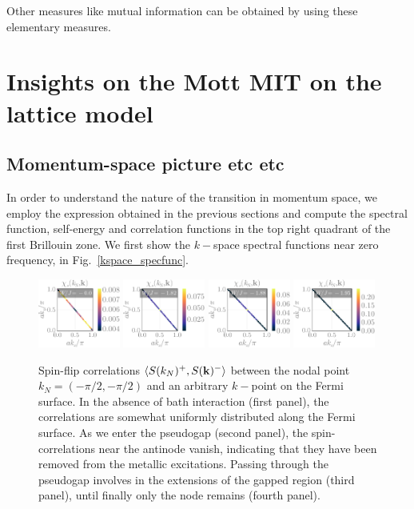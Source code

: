 \documentclass[reprint,hidelinks,onecolumn]{revtex4-2}
\begin{document}
Other measures like mutual information can be obtained by using these elementary measures.

\section{Insights on the Mott MIT on the lattice model}
\subsection{Momentum-space picture etc etc}
In order to understand the nature of the transition in momentum space, we employ the expression obtained in the previous sections and compute the spectral function, self-energy and correlation functions in the top right quadrant of the first Brillouin zone. We first show the \(k-\)space spectral functions near zero frequency, in Fig.~\ref{kspace_specfunc}.
\begin{figure}[htpb]
	\centering
	\includegraphics[width=0.24\textwidth]{tiledSF-1.pdf}
	\includegraphics[width=0.24\textwidth]{tiledSF-2.pdf}
	\includegraphics[width=0.24\textwidth]{tiledSF-3.pdf}
	\includegraphics[width=0.24\textwidth]{tiledSF-4.pdf}
	\caption{Spin-flip correlations \(\left<S(k_N)^+, S({\bf k})^-\right>\) between the nodal point \(k_N = \left( -\pi/2, -\pi/2\right)\) and an arbitrary \(k-\)point on the Fermi surface. In the absence of bath interaction (first panel), the correlations are somewhat uniformly distributed along the Fermi surface. As we enter the pseudogap (second panel), the spin-correlations near the antinode vanish, indicating that they have been removed from the metallic excitations. Passing through the pseudogap involves in the extensions of the gapped region (third panel), until finally only the node remains (fourth panel).}
	\label{tiledSF}
\end{figure}
\end{document}
